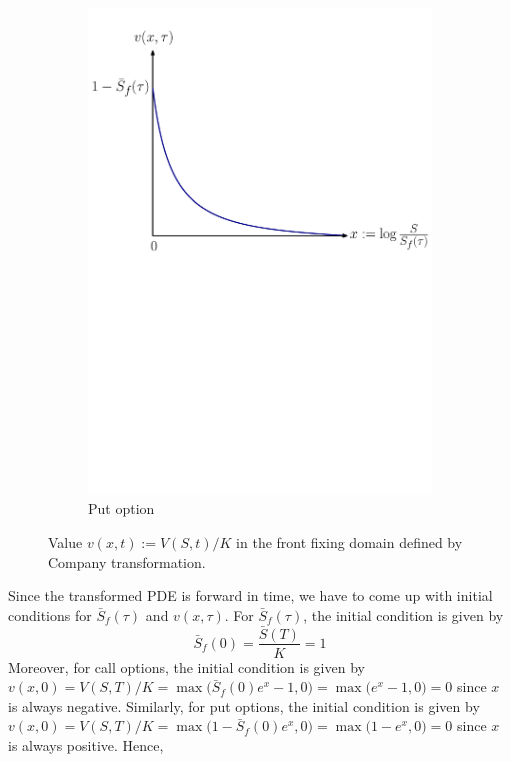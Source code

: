 \begin{figure}[H]
\begin{subfigure}{0.5\textwidth}
    \includegraphics[width=\textwidth]{chapters/chapter2/CompanyPutOption.pdf}
    \caption{Put option}
    \label{fig:blackscholes:frontfixingmethod:company_put_value_vs_curve}
  \end{subfigure}
  \caption{Value $v(x,t) := V(S,t) / K$ in the front fixing domain defined by Company transformation.}
  \label{fig:blackscholes:frontfixingmethod:company_value_vs_curve}
\end{figure}
Since the transformed PDE is forward in time, we have to come up with initial conditions for $\bar{S}_f(\tau)$ and $v(x, \tau)$. For $\bar{S}_f(\tau)$, the initial condition is given by
\begin{equation}
  \bar{S}_f(0) = \dfrac{\bar{S}(T)}{K} = 1
\end{equation}
Moreover, for call options, the initial condition is given by $v(x, 0) = V(S, T) / K = \max\big(\bar{S}_f(0)e^{x} - 1, 0\big) = \max\big(e^{x} - 1, 0\big) = 0$ since $x$ is always negative. Similarly, for put options, the initial condition is given by $v(x, 0) = V(S, T) / K = \max\big(1 - \bar{S}_f(0)e^x, 0\big) = \max\big(1 - e^x, 0\big) = 0$ since $x$ is always positive. Hence,
